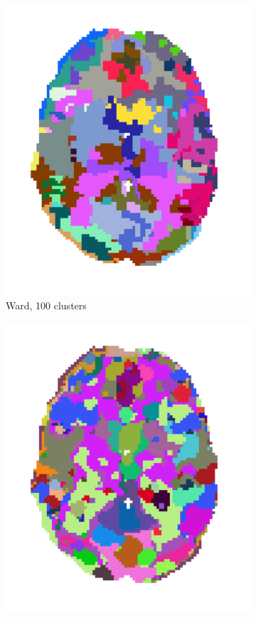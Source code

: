 \documentclass{frontiersSCNS} %
\begin{document}
\begin{figure}[hbtp]
\begin{subfigure}[b]{.23\linewidth}
        \includegraphics[width=\linewidth]{img/clustering/ward_100}
        \caption{Ward, 100 clusters}
      \end{subfigure}
      \hfill
      \begin{subfigure}[b]{.23\linewidth}
        \includegraphics[width=\linewidth]{img/clustering/kmeans_1000}

\end{subfigure}
\end{figure}
\end{document}
